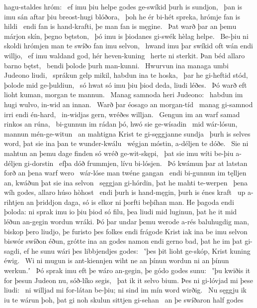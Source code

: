 hagu-staldes hróm: \hld\ ef imu þiu helpe godes
ge-swíkid þurh is sundjon, \hld\ þan is imu sán aftar þiu
breost-hugi blóðora, \hld\ þoh he ér bi-hét spreka,
hrómje fan is hildi \hld\ endi fan is hand-krafti,
þe man fan is męgine. \hld\ Þat warð þar an þemu márjon skín,
þegno bętston, \hld\ þó imu is þiodanes gi-swék
hèlag helpe. \hld\ Be-þiu ni skoldi hrómjen man
te swíðo fan imu selvon, \hld\ hwand imu þar swíkid oft
wán endi willjo, \hld\ ef imu waldand god,
hér heven-kuning \hld\ herte ni sterkit.
Þan béd allaro barno bętst, \hld\ bendi þolode
þurh man-kunni. \hld\ Hwurvun ina managa umbi
Judeono liudi, \hld\ sprákun gelp mikil,
habdun ina te hoska, \hld\ þar he gi-heftid stód,
þolode mid ge-þuldiun, \hld\ só hwat só imu þiu þiod deda,
liudi léðes. \hld\ Þó warð eft lioht kuman,
morgan te mannun. \hld\ Manag samnoda
heri Judeono: \hld\ habdun im hugi wulvo,
in-wid an innan. \hld\ Warð þar éosago
an morgan-tíd \hld\ manag gi-samnod
irri endi én-hard, \hld\ in-widjas gern,
wréðes willjan. \hld\ Gengun im an warf samad
rinkos an rúna, \hld\ bi-gunnun im rádan þó,
hwó sie ge-wísadin \hld\ mid wár-lósun,
mannun mén-ge-witun \hld\ an mahtigna Krist
te gi-sęggjanne sundja \hld\ þurh is selves word,
þat sie ina þan te wunder-kwálu \hld\ wégjan móstin,
a-déljen te dóðe. \hld\ Sie ni mahtun an þemu dage finden
só wréð ge-wit-skępi, \hld\ þat sie imu wíti be-þiu
a-déljen gi-dorstin \hld\ efþa dóð frummjen,
lívu bi-lósjen. \hld\ Þó kwámun þar at latstan forð
an þena warf wero \hld\ wár-lóse man
twéne gangan \hld\ endi bi-gunnun im tęlljen an,
kwáðun þat sie ina selvon \hld\ sęggjan gi-hórdin,
þat he mahti te-werpen \hld\ þena wíh godes,
allaro húso hòhost \hld\ endi þurh is hand-męgin,
þurh is énes kraft \hld\ up a-rihtjen
an þriddjon daga, só is elkor ni þorfti beþíhan man.
He þagoda endi þoloda: ni sprak imu io þiu þiod só filu,
þea liudi mid luginun, þat he it mid léðun an-gegin
wordun wráki. Þó þar undar þemu werode a-rés
baluhugdig man, biskop þero liudjo,
þe furisto þes folkes endi frágode Krist
iak ina be imu selvon biswór swíðon éðun,
grótte ina an godes namon endi gerno bad,
þat he im þat gi-sagdi, ef he sunu wári
þes libbjendjes godes: \hld\ ʽþes þit lioht ge-skóp,
Krist kuning éwig. \hld\ Wi ni mugun is ant-kiennjen wiht
ne an þínun wordun ni an þínun werkun.ʼ \hld\ Þó sprak imu eft þe wáro an-gegin,
þe gódo godes sunu: \hld\ ʽþu kwiðis it for þesun Judeon nu,
sóð-líko segis, \hld\ þat ik it selvo bium.
Þes ni gi-lóvjad mi þese liudi: \hld\ ni willjad mi for-látan be-þiu;
ni sind im mín word wirðig. \hld\ Nu sęggju ik iu te wárun þoh,
þat gi noh skulun sittjen gi-sehan \hld\ an þe swíðaron half godes

